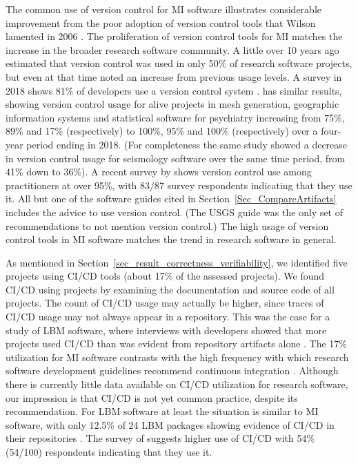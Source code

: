 \documentclass[final, 3p, times, authoryear]{elsarticle}
\begin{document}
The common use of version control for MI software illustrates considerable
improvement from the poor adoption of version control tools that Wilson lamented
in 2006 \citep{Wilson2006}.  The proliferation of version control tools for MI
matches the increase in the broader research software community.  A little over
10 years ago \citet{Nguyen-HoanEtAl2010} estimated that version control was used
in only 50\% of research software projects, but even at that time
\citet{Nguyen-HoanEtAl2010} noted an increase from previous usage levels. A
survey in 2018 shows 81\% of developers use a version control system
\citep{AlNoamanyAndBorghi2018}. \citet{Smith2018} has similar results, showing
version control usage for alive projects in mesh generation, geographic
information systems and statistical software for psychiatry increasing from
75\%, 89\% and 17\% (respectively) to 100\%, 95\% and 100\% (respectively) over
a four-year period ending in 2018. (For completeness the same study showed a
decrease in version control usage for seismology software over the same time
period, from 41\% down to 36\%).  A recent survey by \citet{CarverEtAl2022}
shows version control use among practitioners at over 95\%, with 83/87 survey
respondents indicating that they use it. All but one of the software guides
cited in Section~\ref{Sec_CompareArtifacts} includes the advice to use version
control. (The USGS guide \citep{USGS2019} was the only set of recommendations to
not mention version control.) The high usage of version control tools in MI
software matches the trend in research software in general.

As mentioned in Section~\ref{sec_result_correctness_verifiability}, we
identified five projects using CI/CD tools (about 17\% of the assessed
projects). We found CI/CD using projects by examining the documentation and
source code of all projects. The count of CI/CD usage may actually be higher,
since traces of CI/CD usage may not always appear in a repository.  This was the
case for a study of LBM software, where interviews with developers showed that
more projects used CI/CD than was evident from repository artifacts alone
\citep{Michalski2021}.  The 17\% utilization for MI software contrasts with the
high frequency with which research software development guidelines recommend
continuous integration \citep{BrettEtAl2021, Brown2015, ThielEtAl2020,
Zadka2018, vanGompelEtAl2016}. Although there is currently little data available
on CI/CD utilization for research software, our impression is that CI/CD is not
yet common practice, despite its recommendation.  For LBM software at least the
situation is similar to MI software, with only 12.5\% of 24 LBM packages showing
evidence of CI/CD in their repositories \citep{Michalski2021}.  The survey of
\citet{CarverEtAl2022} suggests higher use of CI/CD with 54\% (54/100)
respondents indicating that they use it.
\end{document}
